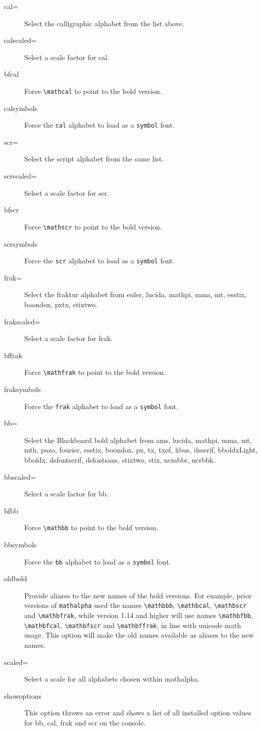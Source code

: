 \documentclass[11pt]{article}
\begin{document}
\begin{description}
\item[cal=] Select the calligraphic alphabet from the list above.
\item[calscaled=] Select a scale factor for \textsf{cal}.
\item[bfcal] Force \verb|\mathcal| to point to the bold version.
\item[calsymbols] Force the \texttt{cal} alphabet to load as a {\tt symbol} font.
\item[scr=] Select the script alphabet from the  same list.
\item[scrscaled=] Select a scale factor for \textsf{scr}.
\item[bfscr] Force \verb|\mathscr| to point to the bold version.
\item[scrsymbols] Force the \texttt{scr} alphabet to load as a {\tt symbol} font.
\item[frak=] Select the fraktur alphabet from \textsf{euler, lucida, mathpi, mma, mt, esstix, boondox, pxtx, stixtwo}.
\item[frakscaled=] Select a scale factor for \textsf{frak}.
\item[bffrak] Force \verb|\mathfrak| to point to the bold version.
\item[fraksymbols] Force the \texttt{frak} alphabet to load as a {\tt symbol} font.
\item[bb=] Select the Blackboard bold alphabet from \textsf{ams, lucida, mathpi, mma, mt, mth, pazo, fourier, esstix, boondox, px, tx, txof, libus, dsserif, bboldxLight, bboldx, dsfontserif, dsfontsans, stixtwo, stix, ncmbbr, ncrbbk}.
\item[bbscaled=] Select a scale factor for \textsf{bb}.
\item[bfbb] Force \verb|\mathbb| to point to the bold version.
\item[bbsymbols] Force the \texttt{bb} alphabet to load as a {\tt symbol} font.
\item[oldbold] Provide aliases to the new names of the bold versions. For example, prior versions of {\tt mathalpha} used the names \verb|\mathbbb|, \verb|\mathbcal|, \verb|\mathbscr| and \verb|\mathbfrak|, while version 1.14 and higher will use names \verb|\mathbfbb|, \verb|\mathbfcal|, \verb|\mathbfscr| and \verb|\mathbffrak|, in line with unicode math usage. This option will make the old names available as aliases to the new names.
\item[scaled=] Select a scale for all alphabets chosen within mathalpha.
\item[showoptions] This option throws an error and shows a list of all installed option values for \textsf{bb}, \textsf{cal}, \textsf{frak} and \textsf{scr} on the console.
\end{description}
\end{document}
